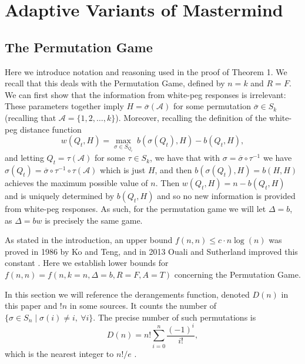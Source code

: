 \documentclass[12pt, a4paper]{article}
\newcommand{\inv}{^{-1}}              %
\begin{document}
\section{Adaptive Variants of Mastermind}
\subsection{The Permutation Game}
Here we introduce notation and reasoning used in the proof of Theorem 1. We recall that this deals with the Permutation Game, defined by $n=k$ and $R=F$. We can first show that the information from white-peg responses is irrelevant: These parameters together imply $H=\overline{\sigma}(\mathcal{A})$ for some permutation $\overline{\sigma}\in S_k$ (recalling that $\mathcal{A}=\{1,2,\ldots, k\}$). Moreover, recalling the definition of the white-peg distance function
\begin{equation*}
	w(Q_t, H) = \max_{\sigma\in S_{Q_t}}~b(\sigma(Q_t), H) - b(Q_t, H),
\end{equation*}
and letting $Q_t = \tau(\mathcal{A})$ for some $\tau \in S_k$, we have that with $\sigma = \overline{\sigma}\circ \tau\inv$ we have $\sigma(Q_t) = \overline{\sigma}\circ\tau\inv\circ\tau(\mathcal A)$ which is just $H$, and then $b(\sigma(Q_t),H) = b(H,H)$ achieves the maximum possible value of $n$. Then $w(Q_t,H) = n - b(Q_t,H)$ and is uniquely determined by $b(Q_t,H)$ and so no new information is provided from white-peg responses. As such, for the permutation game we will let $\Delta = b$, as $\Delta = bw$ is precisely the same game.

 As stated in the introduction, an upper bound $f(n, n)\le c\cdot n\log(n)$ was proved in 1986 by Ko and Teng, and in 2013 Ouali and Sutherland improved this constant \cite{KT86, OS13}. Here we establish lower bounds for $f(n, n) = f(n, k=n, \Delta=b, R=F, A=T)$ concerning the Permutation Game.
 
 In this section we will reference the derangements function, denoted $D(n)$ in this paper and $!n$ in some sources. It counts the number of $\{\sigma \in S_n \mid \sigma(i) \neq i,~\forall i\}$. The precise number of such permutations is
 \begin{equation}\label{derangements}
 D(n) = n!\sum_{i=0}^n \frac{(-1)^i}{i!},
 \end{equation}
which is the nearest integer to $n!/e$  \cite{MH03}. 
\end{document}
